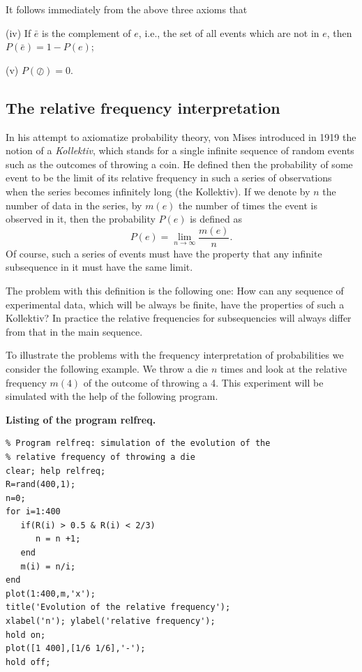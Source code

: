 It follows immediately from the above three axioms that

(iv) If $\bar{e}$ is the complement of $e$, i.e., the set of all 
events which are not in $e$, then
$P(\bar{e}) = 1- P(e)$;

(v) $P(\oslash) = 0$.



\subsection{The relative frequency interpretation}
In his attempt to axiomatize probability theory, von Mises
introduced in 1919 the notion of a {\em Kollektiv}, which stands
for a single infinite sequence of random events such as the 
outcomes of throwing a coin. He defined then the probability of some 
event to be the limit of its relative frequency in such a series of 
observations when the series becomes infinitely long (the 
Kollektiv). If we denote by $n$ the number of data in the series,
by $m(e)$ the number of times the event is observed in it, then
the probability $P(e)$ is defined as
\begin{equation}
P(e) = \lim_{n \rightarrow \infty} \frac{m(e)}{n}.
\end{equation}
Of course, such a series of events must have the property that any 
infinite subsequence in it must have the same limit. 

The problem with this definition is the following one: How can any 
sequence of experimental data, which will be always be finite, 
have the properties of such a Kollektiv? In practice the 
relative frequencies for subsequencies will always differ from 
that in the main sequence.

To illustrate the problems with the frequency interpretation of
probabilities we consider the following example. We throw a die 
$n$ times and
look at the relative frequency $m(4)$ of the outcome of throwing a 
4. This experiment will be simulated with the help of the 
following program.

{\bf Listing of the program relfreq.}
\begin{verbatim}
% Program relfreq: simulation of the evolution of the
% relative frequency of throwing a die
clear; help relfreq;
R=rand(400,1);
n=0;
for i=1:400
   if(R(i) > 0.5 & R(i) < 2/3) 
      n = n +1;
   end
   m(i) = n/i;
end
plot(1:400,m,'x');
title('Evolution of the relative frequency');
xlabel('n'); ylabel('relative frequency');
hold on;
plot([1 400],[1/6 1/6],'-');
hold off;
\end{verbatim}


